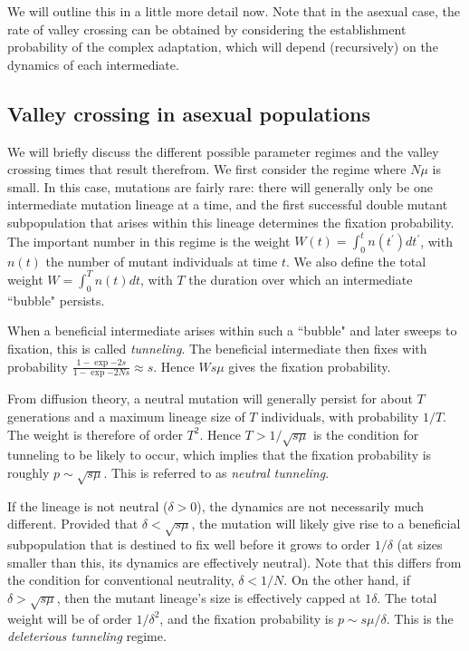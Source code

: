 \documentclass[10pt]{revtex4}
\begin{document}
We will outline this in a little more detail now.
Note that in the asexual case, the rate of valley crossing can be obtained by considering the establishment probability of the complex adaptation, which will depend (recursively) on the dynamics of each intermediate.

\subsection{Valley crossing in asexual populations}

We will briefly discuss the different possible parameter regimes and the valley crossing times that result therefrom.
We first consider the regime where $N\mu$ is small.
In this case, mutations are fairly rare: there will generally only be one intermediate mutation lineage at a time, and the first successful double mutant subpopulation that arises within this lineage determines the fixation probability.
The important number in this regime is the weight $W(t) = \int_0^t n(t^\prime) dt^\prime$, with $n(t)$ the number of mutant individuals at time $t$.
We also define the total weight $W = \int_0^T n(t)dt$, with $T$ the duration over which an intermediate ``bubble" persists.

When a beneficial intermediate arises within such a ``bubble" and later sweeps to fixation, this is called \emph{tunneling}. The beneficial intermediate then fixes with probability $\frac{1-\exp{-2s}}{1-\exp{-2Ns}} \approx s$. Hence $Ws\mu$ gives the fixation probability.

From diffusion theory, a neutral mutation will generally persist for about $T$ generations and a maximum lineage size of $T$ individuals, with probability $1/T$.
The weight is therefore of order $T^2$.
Hence $T > 1/\sqrt{s\mu}$ is the condition for tunneling to be likely to occur, which implies that the fixation probability is roughly $p \sim \sqrt{s\mu}$. This is referred to as \emph{neutral tunneling}.

If the lineage is not neutral ($\delta > 0$), the dynamics are not necessarily much different.
Provided that $\delta < \sqrt{s\mu}$, the mutation will likely give rise to a beneficial subpopulation that is destined to fix well before it grows to order $1/\delta$ (at sizes smaller than this, its dynamics are effectively neutral).
Note that this differs from the condition for conventional neutrality, $\delta < 1/N$.
On the other hand, if $\delta > \sqrt{s\mu}$, then the mutant lineage's size is effectively capped at $1\delta$.
The total weight will be of order $1/\delta^2$, and the fixation probability is $p \sim s\mu/\delta$. This is the \emph{deleterious tunneling} regime.
\end{document}
